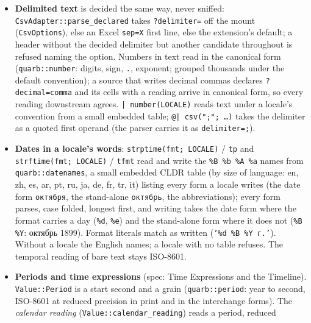 \documentclass{report}
\begin{document}
\begin{itemize}
  silently missing); \texttt{TreeSitterAdapter} /
  \texttt{CodeModel::open\_with\_decoding} and
  \texttt{quarb\_text::read\_conllu\_dir\_with} on a source
  file. A response body over HTTP is read whole under
  \texttt{source::text\_from\_reader} (a 256 MiB bound, strict
  UTF-8\,---\,the wire formats are UTF-8 by their standards), never
  cut at a client library's cap nor replaced.
\item \textbf{Delimited text} is decided the same way, never
  sniffed: \texttt{CsvAdapter::parse\_declared} takes
  \texttt{?delimiter=} off the mount (\texttt{CsvOptions}), else an
  Excel \texttt{sep=X} first line, else the extension's default; a
  header without the decided delimiter but another candidate
  throughout is refused naming the option. Numbers in text read in
  the canonical form (\texttt{quarb::number}: digits, sign,
  \texttt{.}, exponent; grouped thousands under the default
  convention); a source that writes decimal commas declares
  \texttt{?decimal=comma} and its cells with a reading arrive in
  canonical form, so every reading downstream agrees.
  \texttt{| number(LOCALE)} reads text under a locale's convention
  from a small embedded table; \texttt{@| csv(";"; …)} takes the
  delimiter as a quoted first operand (the parser carries it as
  \texttt{delimiter=;}).
\item \textbf{Dates in a locale's words}: \texttt{strptime(fmt;
  LOCALE)} / \texttt{tp} and \texttt{strftime(fmt; LOCALE)} /
  \texttt{tfmt} read and write the \texttt{\%B \%b \%A \%a} names
  from \texttt{quarb::datenames}, a small embedded CLDR table (by size
  of language: en, zh, es, ar, pt, ru, ja, de, fr, tr, it) listing every form a locale writes
  (the date form \texttt{октября}, the stand-alone
  \texttt{октябрь}, the abbreviations); every form parses, case
  folded, longest first, and writing takes the date form where
  the format carries a day (\texttt{\%d}, \texttt{\%e}) and the
  stand-alone form where it does not (\texttt{\%B \%Y}: октябрь
  1899). Format
  literals match as written (\texttt{'\%d \%B \%Y г.'}). Without a
  locale the English names; a locale with no table refuses. The
  temporal reading of bare text stays ISO-8601.
\item \textbf{Periods and time expressions} (spec: Time
  Expressions and the Timeline). \texttt{Value::Period} is a
  start second and a grain (\texttt{quarb::period}: year to
  second, ISO-8601 at reduced precision in print and in the
  interchange forms). The \emph{calendar reading}
  (\texttt{Value::calendar\_reading}) reads a period, reduced

\end{itemize}
\end{document}
